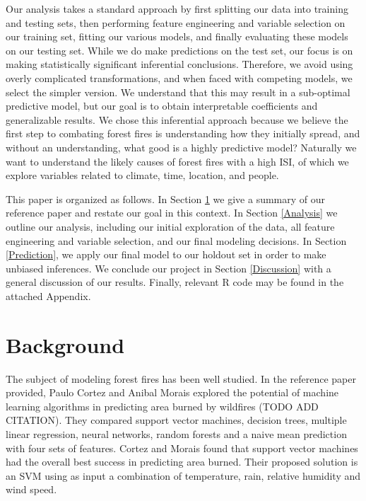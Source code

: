 \documentclass{article}
\begin{document}
Our analysis takes a standard approach by first splitting our data into training and testing sets, then performing feature engineering and variable selection on our training set, fitting our various models, and finally evaluating these models on our testing set. While we do make predictions on the test set, our focus is on making statistically significant inferential conclusions. Therefore, we avoid using overly complicated transformations, and when faced with competing models, we select the simpler version. We understand that this may result in a sub-optimal predictive model, but our goal is to obtain interpretable coefficients and generalizable results. We chose this inferential approach because we believe the first step to combating forest fires is understanding how they initially spread, and without an understanding, what good is a highly predictive model? Naturally we want to understand the likely causes of forest fires with a high ISI, of which we explore variables related to climate, time, location, and people.

This paper is organized as follows. In Section \ref{Background} we give a summary of our reference paper and restate our goal in this context. In Section \ref{Analysis} we outline our analysis, including our initial exploration of the data, all feature engineering and variable selection, and our final modeling decisions. In Section \ref{Prediction}, we apply our final model to our holdout set in order to make unbiased inferences. We conclude our project in Section \ref{Discussion} with a general discussion of our results. Finally, relevant R code may be found in the attached Appendix.

\section{Background}\label{Background}



The subject of modeling forest fires has been well studied. In the reference paper provided, Paulo Cortez and Anibal Morais explored the potential of machine learning algorithms in predicting area burned by wildfires (TODO ADD CITATION). They compared support vector machines, decision trees, multiple linear regression, neural networks, random forests and a naive mean prediction with four sets of features. Cortez and Morais found that support vector machines had the overall best success in predicting area burned. Their proposed solution is an SVM using as input a combination of temperature, rain, relative humidity and wind speed.
\end{document}

